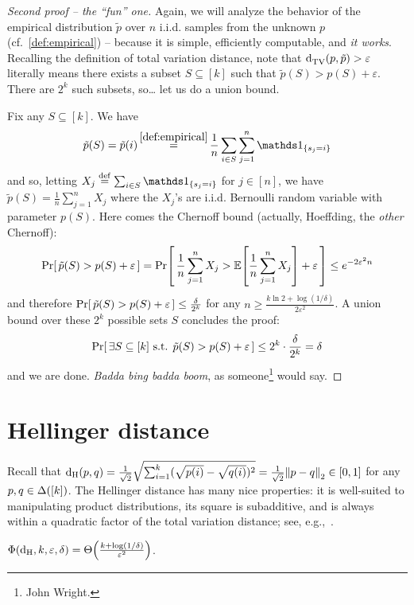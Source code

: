 \documentclass[10pt]{article}
\newcommand{\dst}{\varepsilon}
\newcommand{\ab}{k}
\newcommand{\ns}{n}
\begin{document}
\begin{proof}[Second proof -- the ``fun'' one]
Again, we will analyze the behavior of the empirical distribution $\tilde{p}$ over $\ns$ i.i.d. samples from the unknown $p$ (cf.~\eqref{def:empirical}) -- because it is simple, efficiently computable, and \emph{it works}.  Recalling the definition of total variation distance, note that $\totalvardist{p}{\tilde{p}} > \dst$ literally means there exists a subset $S\subseteq [\ab]$ such that $\tilde{p}(S) > p(S) + \dst$. There are $2^\ab$ such subsets, so\dots{} let us do a union bound.

Fix any $S\subseteq[\ab]$. We have
\[
\tilde{p}(S) = \tilde{p}(i) \operatorname*{=}^{\eqref{def:empirical}} \frac{1}{\ns} \sum_{i\in S} \sum_{j=1}^\ns \indic{s_j=i}
\]
and so, letting $X_j \eqdef \sum_{i\in S}\indic{s_j=i}$ for $j\in [\ns]$, we have
$
\tilde{p}(S) = \frac{1}{\ns}\sum_{j=1}^\ns X_j
$ where the $X_j$'s are i.i.d. Bernoulli random variable with parameter $p(S)$. Here comes the Chernoff bound (actually, Hoeffding, the \emph{other} Chernoff):
\[
    \probaOf{ \tilde{p}(S) > p(S) + \dst } = \probaOf{ \frac{1}{\ns}\sum_{j=1}^\ns X_j > \expect{\frac{1}{\ns}\sum_{j=1}^\ns X_j} + \dst } \leq e^{-2\dst^2 \ns}
\]
and therefore $\probaOf{ \tilde{p}(S) > p(S) + \dst } \leq \frac{\delta}{2^\ab}$ for any $\ns\geq \frac{\ab\ln 2+\log(1/\delta)}{2\dst^2}$. A union bound over these $2^\ab$ possible sets $S$ concludes the proof:
\[
    \probaOf{ \exists S\subseteq [\ab] \text{ s.t. }\tilde{p}(S) > p(S) + \dst } \leq 2^\ab\cdot \frac{\delta}{2^\ab} = \delta
\]
and we are done. \emph{Badda bing badda boom}, as someone\footnote{John Wright.} would say.
\end{proof}

\section{Hellinger distance}

Recall that $\hellinger{p}{q} = \frac{1}{\sqrt{2}}\sqrt{\sum_{i=1}^\ab (\sqrt{p(i)}-\sqrt{q(i)})^2} = \frac{1}{\sqrt{2}}\normtwo{p-q}\in[0,1]$ for any $p,q\in\distribs{[\ab]}$. The Hellinger distance has many nice properties: it is well-suited to manipulating product distributions, its square is subadditive, and is always within a quadratic factor of the total variation distance; see, e.g.,~\cite[Appendix~C.2]{Canonne:15}.

\begin{theorem}\label{theo:learning:hellinger}
  $\Phi(\dhell,\ab,\dst,\delta) = \bigTheta{\frac{\ab+\log(1/\delta)}{\dst^2}}$.
\end{theorem}
\end{document}
